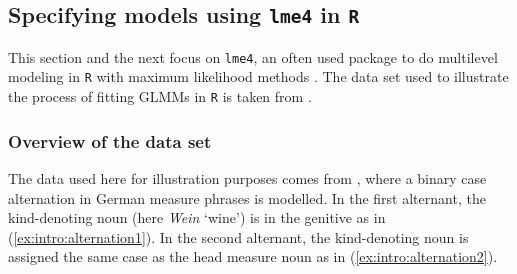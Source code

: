 \subsection{Specifying models using \texttt{lme4} in \texttt{R}}
\label{sec:specifyingmodelsusinglme4inr}

This section and the next focus on \texttt{lme4}, an often used package to do multilevel modeling in \texttt{R} with maximum likelihood methods \citep{BatesEa2015}.
The data set used to illustrate the process of fitting GLMMs in \texttt{R} is taken from \citet{Schaefer2018}.

\subsubsection{Overview of the data set}

The data used here for illustration purposes comes from \citet{Schaefer2018}, where a binary case alternation in German measure phrases is modelled.
In the first alternant, the kind-denoting noun (here \textit{Wein} `wine') is in the genitive as in (\ref{ex:intro:alternation1}).
In the second alternant, the kind-denoting noun is assigned the same case as the head measure noun as in (\ref{ex:intro:alternation2}).

\begin{exe}
  \ex\label{ex:intro:alternation}
  \begin{xlist}
  \end{xlist}
\end{exe}

